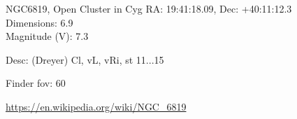 \begin{block}{NGC6819, Open Cluster in Cyg}
    RA: 19:41:18.09, Dec: +40:11:12.3 \\ 
    Dimensions: 6.9 \\ 
    Magnitude (V): 7.3


    Desc: (Dreyer) Cl, vL, vRi, st 11...15 

    Finder fov: 60 

    \url{https://en.wikipedia.org/wiki/NGC_6819} 
\end{block}